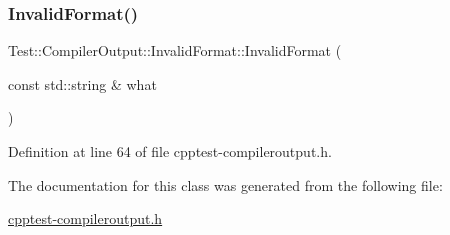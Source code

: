 \subsubsection{\texorpdfstring{Invalid\+Format()}{InvalidFormat()}}
{\footnotesize\ttfamily Test\+::\+Compiler\+Output\+::\+Invalid\+Format\+::\+Invalid\+Format (\begin{DoxyParamCaption}\item[{const std\+::string \&}]{what }\end{DoxyParamCaption})\hspace{0.3cm}{\ttfamily [inline]}}



Definition at line 64 of file cpptest-\/compileroutput.\+h.



The documentation for this class was generated from the following file\+:\begin{DoxyCompactItemize}
\item 
\mbox{\hyperlink{cpptest-compileroutput_8h}{cpptest-\/compileroutput.\+h}}\end{DoxyCompactItemize}
